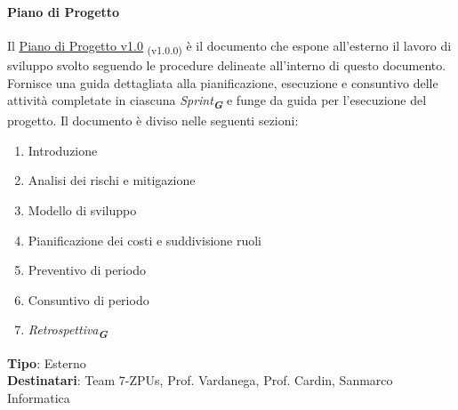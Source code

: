 \documentclass[a4paper,12pt]{article}
\newcommand{\glossario}[1]{\textit{#1}\textsubscript{\textbf{\textit{\textcolor{lightblack}{G}}}}}
\newcommand{\ped}[1]{\textsubscript{#1}}
\begin{document}
\paragraph{Piano di Progetto}\label{pianoDiProgetto}
Il
\href{https://7-zpus.github.io/Docs/assets/3_PB/DocumentiEsterni/PianoDiProgetto.pdf}{\ul{Piano
        di Progetto v1.0}} \ped{(v1.0.0)} è il
documento che espone all'esterno il lavoro di sviluppo svolto seguendo le
procedure delineate all'interno di questo documento. Fornisce una guida
dettagliata alla pianificazione, esecuzione e consuntivo delle attività
completate in ciascuna \glossario{Sprint} e funge da guida per l'esecuzione del progetto. Il documento è diviso nelle seguenti sezioni:
\begin{enumerate}
    \item Introduzione
    \item Analisi dei rischi e mitigazione
    \item Modello di sviluppo
    \item Pianificazione dei costi e suddivisione ruoli
    \item Preventivo di periodo
    \item Consuntivo di periodo
    \item \glossario{Retrospettiva}
\end{enumerate}
\textbf{Tipo}: Esterno \\
\textbf{Destinatari}: Team 7-ZPUs, Prof. Vardanega, Prof. Cardin, Sanmarco Informatica \\
\end{document}
